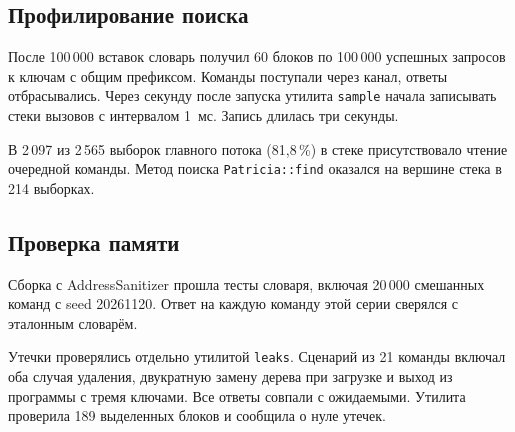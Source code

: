 \subsection{Профилирование поиска}

После 100\,000 вставок словарь получил 60 блоков по 100\,000 успешных запросов к ключам с общим префиксом. Команды поступали через канал, ответы отбрасывались. Через секунду после запуска утилита \texttt{sample} начала записывать стеки вызовов с интервалом 1~мс. Запись длилась три секунды.

В 2\,097 из 2\,565 выборок главного потока (81,8\,\%) в стеке присутствовало чтение очередной команды. Метод поиска \texttt{Patricia::find} оказался на вершине стека в 214 выборках.

\clearpage
\subsection{Проверка памяти}

Сборка с AddressSanitizer прошла тесты словаря, включая 20\,000 смешанных команд с seed 20261120. Ответ на каждую команду этой серии сверялся с эталонным словарём.

Утечки проверялись отдельно утилитой \texttt{leaks}. Сценарий из 21 команды включал оба случая удаления, двукратную замену дерева при загрузке и выход из программы с тремя ключами. Все ответы совпали с ожидаемыми. Утилита проверила 189 выделенных блоков и сообщила о нуле утечек.
\par
\endgroup
